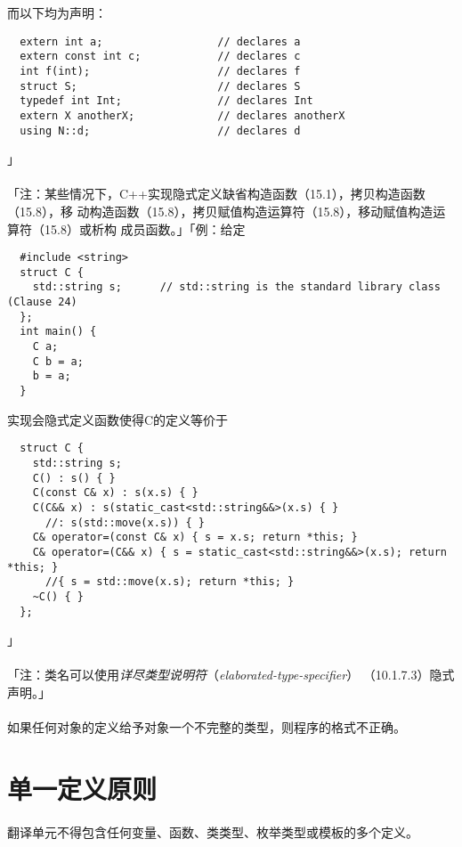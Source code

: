 而以下均为声明：
\begin{lstlisting}
  extern int a;                  // declares a
  extern const int c;            // declares c
  int f(int);                    // declares f
  struct S;                      // declares S
  typedef int Int;               // declares Int
  extern X anotherX;             // declares anotherX
  using N::d;                    // declares d
\end{lstlisting}
」

\paragraph{}
「注：某些情况下，C++实现隐式定义缺省构造函数（15.1），拷贝构造函数（15.8），移
动构造函数（15.8），拷贝赋值构造运算符（15.8），移动赋值构造运算符（15.8）或析构
成员函数。」「例：给定
\begin{lstlisting}
  #include <string>
  struct C {
    std::string s;      // std::string is the standard library class (Clause 24)
  };
  int main() {
    C a;
    C b = a;
    b = a;
  }
\end{lstlisting}
实现会隐式定义函数使得C的定义等价于
\begin{lstlisting}
  struct C {
    std::string s;
    C() : s() { }
    C(const C& x) : s(x.s) { }
    C(C&& x) : s(static_cast<std::string&&>(x.s) { }
      //: s(std::move(x.s)) { }
    C& operator=(const C& x) { s = x.s; return *this; }
    C& operator=(C&& x) { s = static_cast<std::string&&>(x.s); return *this; }
      //{ s = std::move(x.s); return *this; }
    ~C() { }
  };
\end{lstlisting}」

\paragraph{}
「注：类名可以使用\textit{详尽类型说明符}（\textit{elaborated-type-specifier}）
（10.1.7.3）隐式声明。」

\paragraph{}
如果任何对象的定义给予对象一个不完整的类型，则程序的格式不正确。


\section{单一定义原则}

\paragraph{}
翻译单元不得包含任何变量、函数、类类型、枚举类型或模板的多个定义。

